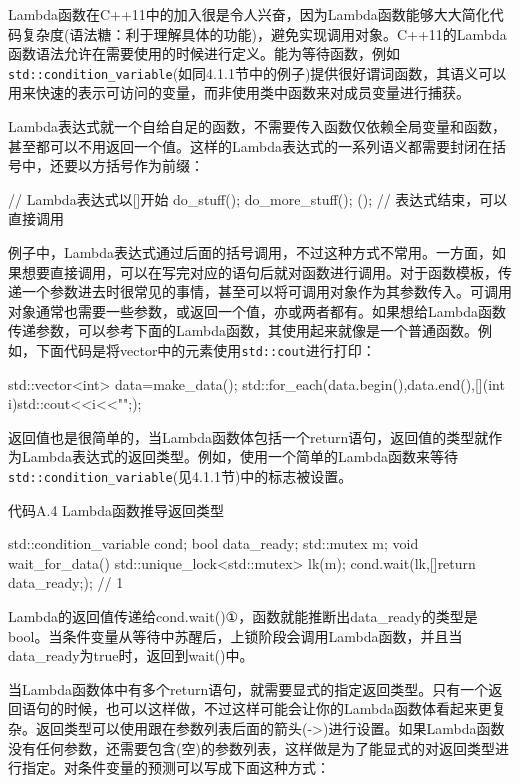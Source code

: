 
Lambda函数在C++11中的加入很是令人兴奋，因为Lambda函数能够大大简化代码复杂度(语法糖：利于理解具体的功能)，避免实现调用对象。C++11的Lambda函数语法允许在需要使用的时候进行定义。能为等待函数，例如\texttt{std::condition\_variable}(如同4.1.1节中的例子)提供很好谓词函数，其语义可以用来快速的表示可访问的变量，而非使用类中函数来对成员变量进行捕获。

Lambda表达式就一个自给自足的函数，不需要传入函数仅依赖全局变量和函数，甚至都可以不用返回一个值。这样的Lambda表达式的一系列语义都需要封闭在括号中，还要以方括号作为前缀：

\begin{cpp}
[]{  // Lambda表达式以[]开始
  do_stuff();
  do_more_stuff();
}();  // 表达式结束，可以直接调用
\end{cpp}

例子中，Lambda表达式通过后面的括号调用，不过这种方式不常用。一方面，如果想要直接调用，可以在写完对应的语句后就对函数进行调用。对于函数模板，传递一个参数进去时很常见的事情，甚至可以将可调用对象作为其参数传入。可调用对象通常也需要一些参数，或返回一个值，亦或两者都有。如果想给Lambda函数传递参数，可以参考下面的Lambda函数，其使用起来就像是一个普通函数。例如，下面代码是将vector中的元素使用\texttt{std::cout}进行打印：

\begin{cpp}
std::vector<int> data=make_data();
std::for_each(data.begin(),data.end(),[](int i){std::cout<<i<<"\n";});
\end{cpp}

返回值也是很简单的，当Lambda函数体包括一个return语句，返回值的类型就作为Lambda表达式的返回类型。例如，使用一个简单的Lambda函数来等待\texttt{std::condition\_variable}(见4.1.1节)中的标志被设置。

代码A.4 Lambda函数推导返回类型

\begin{cpp}
std::condition_variable cond;
bool data_ready;
std::mutex m;
void wait_for_data()
{
  std::unique_lock<std::mutex> lk(m);
  cond.wait(lk,[]{return data_ready;});  // 1
}
\end{cpp}

Lambda的返回值传递给cond.wait()①，函数就能推断出data\_ready的类型是bool。当条件变量从等待中苏醒后，上锁阶段会调用Lambda函数，并且当data\_ready为true时，返回到wait()中。

当Lambda函数体中有多个return语句，就需要显式的指定返回类型。只有一个返回语句的时候，也可以这样做，不过这样可能会让你的Lambda函数体看起来更复杂。返回类型可以使用跟在参数列表后面的箭头(->)进行设置。如果Lambda函数没有任何参数，还需要包含(空)的参数列表，这样做是为了能显式的对返回类型进行指定。对条件变量的预测可以写成下面这种方式：

